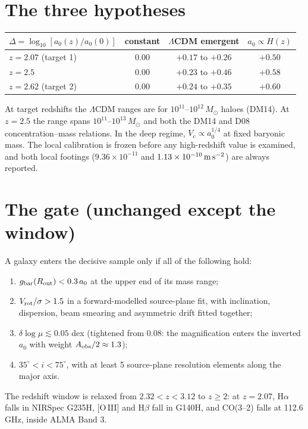 \documentclass[11pt,letterpaper]{article}
\begin{document}
\section{The three hypotheses}
\begin{center}\begin{tabular}{L{5.2cm}ccc}\toprule
$\Delta=\log_{10}[a_0(z)/a_0(0)]$ & constant & $\Lambda$CDM emergent & $a_0\propto H(z)$\\\midrule
$z=2.07$ (target 1) & $0.00$ & $+0.17$ to $+0.26$ & $+0.50$\\
$z=2.5$ & $0.00$ & $+0.23$ to $+0.46$ & $+0.58$\\
$z=2.62$ (target 2) & $0.00$ & $+0.24$ to $+0.35$ & $+0.60$\\\bottomrule\end{tabular}\end{center}
At target redshifts the $\Lambda$CDM ranges are for $10^{11}$--$10^{12}\,M_\odot$ haloes (DM14). At $z=2.5$ the range
spans $10^{11}$--$10^{13}\,M_\odot$ and both the DM14 and D08 concentration--mass relations. In the deep regime,
$V_c\propto a_0^{1/4}$ at fixed baryonic mass. The local calibration is frozen before any high-redshift value is
examined, and both local footings ($9.36\times10^{-11}$ and $1.13\times10^{-10}\,{\rm m\,s^{-2}}$) are always reported.

\section{The gate (unchanged except the window)}
A galaxy enters the decisive sample only if all of the following hold:
\begin{enumerate}\itemsep0pt
\item $g_{\rm bar}(R_{\rm out})<0.3\,a_0$ at the upper end of its mass range;
\item $V_{\rm rot}/\sigma>1.5$ in a forward-modelled source-plane fit, with inclination, dispersion, beam smearing
and asymmetric drift fitted together;
\item $\delta\log\mu\lesssim0.05$ dex (tightened from 0.08: the magnification enters the inverted $a_0$ with weight
$A_{\rm obs}/2\approx1.3$);
\item $35^\circ<i<75^\circ$, with at least 5 source-plane resolution elements along the major axis.
\end{enumerate}
The redshift window is relaxed from $2.32<z<3.12$ to $z\geq2$: at $z=2.07$, H$\alpha$ falls in NIRSpec G235H,
[O\,III] and H$\beta$ fall in G140H, and CO(3--2) falls at 112.6 GHz, inside ALMA Band 3.
\end{document}
